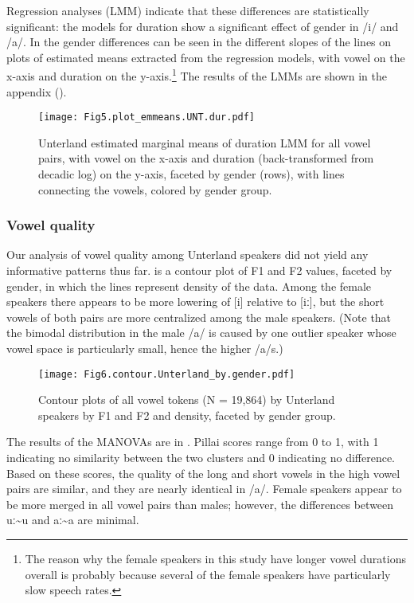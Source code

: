 \documentclass[output=paper,colorlinks,citecolor=brown]{langscibook}
\begin{document}
Regression analyses (LMM) indicate that these differences are statistically significant: the models for duration show a significant effect of gender in \mbox{/i/} and \mbox{/a/}. In  the gender differences can be seen in the different slopes of the lines on plots of estimated means extracted from the regression models, with vowel on the x-axis and duration on the y-axis.\footnote{The reason why the female speakers in this study have longer vowel durations overall is probably because several of the female speakers have particularly slow speech rates.} The results of the LMMs are shown in the appendix ().

\begin{figure}
\texttt{[image: Fig5.plot\_emmeans.UNT.dur.pdf]}
\caption{\label{fig:nove:5} Unterland estimated marginal means of duration LMM for all vowel pairs, with vowel on the x-axis and duration (back-transformed from decadic log) on the y-axis, faceted by gender (rows), with lines connecting the vowels, colored by gender group.}
\end{figure}

\subsubsection{Vowel quality}
\label{sec:nove:5.1.2}

Our analysis of vowel quality among Unterland speakers did not yield any informative patterns thus far.  is a contour plot of F1 and F2 values, faceted by gender, in which the lines represent density of the data. Among the female speakers there appears to be more lowering of [i] relative to [iː], but the short vowels of both pairs are more centralized among the male speakers. (Note that the bimodal distribution in the male \mbox{/a/} is caused by one outlier speaker whose vowel space is particularly small, hence the higher \mbox{/a/s}.)

\begin{figure}
\texttt{[image: Fig6.contour.Unterland\_by.gender.pdf]}
\caption{\label{fig:nove:6}Contour plots of all vowel tokens (N = 19,864) by Unterland speakers by F1 and F2 and density, faceted by gender group.}
\end{figure}

The results of the MANOVAs are in . Pillai scores range from 0 to 1, with 1 indicating no similarity between the two clusters and 0 indicating no difference. Based on these scores, the quality of the long and short vowels in the high vowel pairs are similar, and they are nearly identical in \mbox{/a/}. Female speakers appear to be more merged in all vowel pairs than males; however, the differences between uː{\textasciitilde}u and aː{\textasciitilde}a are minimal.
\end{document}
